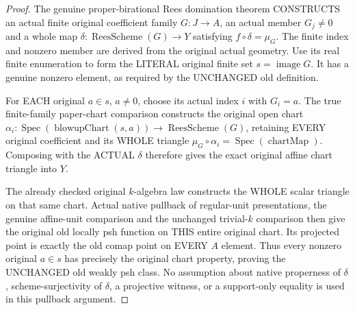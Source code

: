 \begin{proof}
The genuine proper-birational Rees domination theorem CONSTRUCTS an actual
finite original coefficient family $G:J\to A$, an actual member $G_j\ne0$
and a whole map $\delta:\operatorname{ReesScheme}(G)\to Y$ satisfying
$f\circ\delta=\mu_G$. The finite index and nonzero member are derived from
the original actual geometry. Use its real finite enumeration to form the
LITERAL original finite set $s=\operatorname{image}G$. It has a genuine
nonzero element, as required by the UNCHANGED old definition.

For EACH original $a\in s$, $a\ne0$, choose its actual index $i$ with
$G_i=a$. The true finite-family paper-chart comparison constructs the original
open chart $\alpha_i:\operatorname{Spec}(\operatorname{blowupChart}(s,a))\to
\operatorname{ReesScheme}(G)$, retaining EVERY original coefficient and its
WHOLE triangle $\mu_G\circ\alpha_i=\operatorname{Spec}(\operatorname{chartMap})$.
Composing with the ACTUAL $\delta$ therefore gives the exact original affine
chart triangle into $Y$.

The already checked original $k$-algebra law constructs the WHOLE scalar
triangle on that same chart. Actual native pullback of regular-unit presentations,
the genuine affine-unit comparison and the unchanged trivial-$k$ comparison
then give the original old locally psh function on THIS entire original chart.
Its projected point is exactly the old comap point on EVERY $A$ element.
Thus every nonzero original $a\in s$ has precisely the original chart property,
proving the UNCHANGED old weakly psh class. No assumption about native properness
of $\delta$, scheme-surjectivity of $\delta$, a projective witness, or a
support-only equality is used in this pullback argument.
\end{proof}

